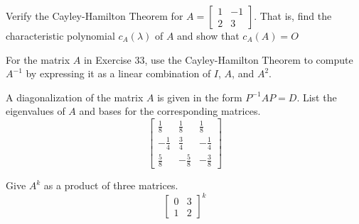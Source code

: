 \documentclass[12pt,letterpaper]{hmcpset}
\begin{document}
\newpage

\begin{problem}[4.3.33]
    Verify the Cayley-Hamilton Theorem for $A=\begin{bmatrix}
    1 & -1 \\ 
    2 & 3
    \end{bmatrix} $. That is, find the characteristic polynomial $c_A(\lambda)$ of $A$ and show that $c_A(A) = O$
\end{problem}

\begin{solution}
    \vfill
\end{solution}

\newpage

\begin{problem}[4.3.37]
    For the matrix $A$ in Exercise 33, use the Cayley-Hamilton Theorem to compute $A^{-1}$ by expressing it as a linear combination of $I$, $A$, and $A^2$.
\end{problem}

\begin{solution}
    \vfill
\end{solution}

\newpage

\begin{problem}[4.4.7]
    A diagonalization of the matrix $A$ is given in the form $P^{-1}AP=D$. List the eigenvalues of $A$ and bases for the corresponding matrices.
    \[
    \begin{bmatrix}
    \frac{1}{8} & \frac{1}{8} & \frac{1}{8} \\ 
    -\frac{1}{4} & \frac{3}{4} & -\frac{1}{4} \\ 
    \frac{5}{8} & -\frac{5}{8} & -\frac{3}{8}
    \end{bmatrix} 
    \]
\end{problem}

\begin{solution}
    \vfill
\end{solution}

\newpage

\begin{problem}[4.4.19]
    Give $A^k$ as a product of three matrices.
    \[
    \begin{bmatrix}
    0 & 3 \\ 
    1 & 2
    \end{bmatrix}^k
    \]
\end{problem}
\end{document}
